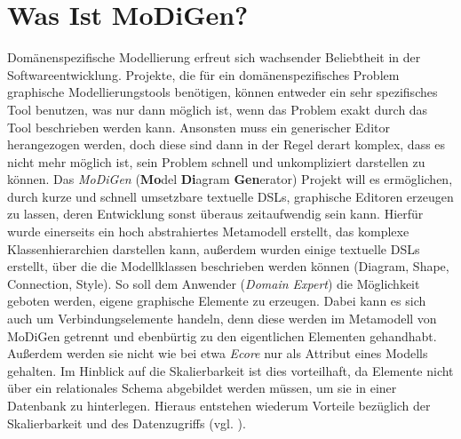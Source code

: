 \section{Was Ist MoDiGen?}\label{modigen}
Domänenspezifische Modellierung erfreut sich wachsender Beliebtheit in der Softwareentwicklung. Projekte, die für ein domänenspezifisches Problem graphische Modellierungstools benötigen, können entweder ein sehr spezifisches Tool benutzen, was nur dann möglich ist, wenn das Problem exakt durch das Tool beschrieben werden kann. Ansonsten muss ein generischer Editor herangezogen werden, doch diese sind dann in der Regel derart komplex, dass es nicht mehr möglich ist, sein Problem schnell und unkompliziert darstellen zu können. Das \textit{MoDiGen} (\textbf{Mo}del \textbf{Di}agram \textbf{Gen}erator) Projekt will es ermöglichen, durch kurze und schnell umsetzbare textuelle DSLs, graphische Editoren erzeugen zu lassen, deren Entwicklung sonst überaus zeitaufwendig sein kann. Hierfür wurde einerseits ein hoch abstrahiertes Metamodell erstellt, das komplexe Klassenhierarchien darstellen kann, außerdem wurden einige textuelle DSLs erstellt, über die die Modellklassen beschrieben werden können (Diagram, Shape, Connection, Style). So soll dem Anwender (\textit{Domain Expert}) die Möglichkeit geboten werden, eigene graphische Elemente zu erzeugen. Dabei kann es sich auch um Verbindungselemente handeln, denn diese werden im Metamodell von MoDiGen getrennt und ebenbürtig zu den eigentlichen Elementen gehandhabt. Außerdem werden sie nicht wie bei etwa \textit{Ecore} nur als Attribut eines Modells gehalten. Im Hinblick auf die Skalierbarkeit ist dies vorteilhaft, da Elemente nicht über ein relationales Schema abgebildet werden müssen, um sie in einer Datenbank zu hinterlegen. Hieraus entstehen wiederum Vorteile bezüglich der Skalierbarkeit und des Datenzugriffs (vgl. ).
